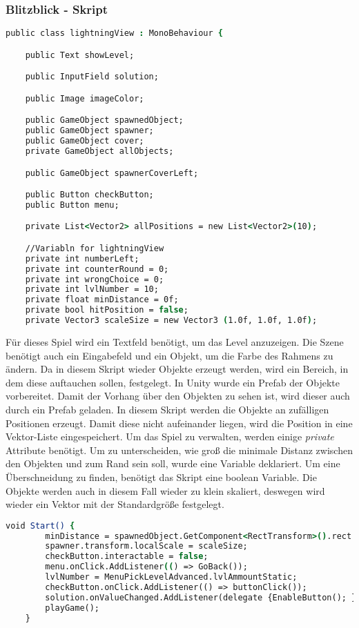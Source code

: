 \subsubsection{Blitzblick - Skript}
\begin{lstlisting}[language=csh, caption={lightningView.cs Variablendeklaration}]
public class lightningView : MonoBehaviour {

	public Text showLevel;

	public InputField solution;

	public Image imageColor;

	public GameObject spawnedObject;
	public GameObject spawner;
	public GameObject cover;
	private GameObject allObjects;

	public GameObject spawnerCoverLeft;

	public Button checkButton;
	public Button menu;

	private List<Vector2> allPositions = new List<Vector2>(10);

	//Variabln for lightningView
	private int numberLeft;
	private int counterRound = 0;
	private int wrongChoice = 0;
	private int lvlNumber = 10;
	private float minDistance = 0f;
	private bool hitPosition = false;
	private Vector3 scaleSize = new Vector3 (1.0f, 1.0f, 1.0f);
\end{lstlisting}
Für dieses Spiel wird ein Textfeld benötigt, um das Level anzuzeigen. Die Szene benötigt auch ein Eingabefeld und ein Objekt, um die Farbe des Rahmens zu ändern. Da in diesem Skript wieder Objekte erzeugt werden, wird ein Bereich, in dem diese auftauchen sollen, festgelegt. In Unity wurde ein Prefab der Objekte vorbereitet. Damit der Vorhang über den Objekten zu sehen ist, wird dieser auch durch ein Prefab geladen. In diesem Skript werden die Objekte an zufälligen Positionen erzeugt. Damit diese nicht aufeinander liegen, wird die Position in eine Vektor-Liste eingespeichert. Um das Spiel zu verwalten, werden einige \textit{private} Attribute benötigt. Um zu unterscheiden, wie groß die minimale Distanz zwischen den Objekten und zum Rand sein soll, wurde eine Variable deklariert. Um eine Überschneidung zu finden, benötigt das Skript eine boolean Variable. Die Objekte werden auch in diesem Fall wieder zu klein skaliert, deswegen wird wieder ein Vektor mit der Standardgröße festgelegt.\\
\begin{lstlisting}[language=csh, caption={lightningView.cs Start-Funktion}]
	void Start() {
		minDistance = spawnedObject.GetComponent<RectTransform>().rect.width / 2;
		spawner.transform.localScale = scaleSize;
		checkButton.interactable = false;
		menu.onClick.AddListener(() => GoBack());
		lvlNumber = MenuPickLevelAdvanced.lvlAmmountStatic;
		checkButton.onClick.AddListener(() => buttonClick());
		solution.onValueChanged.AddListener(delegate {EnableButton(); });
		playGame();
	}
\end{lstlisting}

